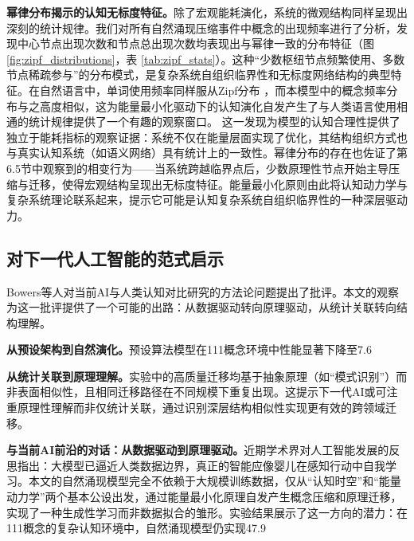\documentclass[12pt,a4paper]{article}
\begin{document}
\textbf{幂律分布揭示的认知无标度特征。}除了宏观能耗演化，系统的微观结构同样呈现出深刻的统计规律。我们对所有自然涌现压缩事件中概念的出现频率进行了分析，发现中心节点出现次数和节点总出现次数均表现出与幂律一致的分布特征（图 \ref{fig:zipf_distributions}，表 \ref{tab:zipf_stats}）。这种“少数枢纽节点频繁使用、多数节点稀疏参与”的分布模式，是复杂系统自组织临界性和无标度网络结构的典型特征。在自然语言中，单词使用频率同样服从Zipf分布 \citep{zipf1949human}，而本模型中的概念频率分布与之高度相似，这为能量最小化驱动下的认知演化自发产生了与人类语言使用相通的统计规律提供了一个有趣的观察窗口。 这一发现为模型的认知合理性提供了独立于能耗指标的观察证据：系统不仅在能量层面实现了优化，其结构组织方式也与真实认知系统（如语义网络）具有统计上的一致性。幂律分布的存在也佐证了第6.5节中观察到的相变行为——当系统跨越临界点后，少数原理性节点开始主导压缩与迁移，使得宏观结构呈现出无标度特征。能量最小化原则由此将认知动力学与复杂系统理论联系起来，提示它可能是认知复杂系统自组织临界性的一种深层驱动力。

\subsection{对下一代人工智能的范式启示}

Bowers等人对当前AI与人类认知对比研究的方法论问题提出了批评。本文的观察为这一批评提供了一个可能的出路：从数据驱动转向原理驱动，从统计关联转向结构理解。

\textbf{从预设架构到自然演化。}预设算法模型在111概念环境中性能显著下降至7.6%

\textbf{从统计关联到原理理解。}实验中的高质量迁移均基于抽象原理（如“模式识别”）而非表面相似性，且相同迁移路径在不同规模下重复出现。这提示下一代AI或可注重原理性理解而非仅统计关联，通过识别深层结构相似性实现更有效的跨领域迁移。

\textbf{与当前AI前沿的对话：从数据驱动到原理驱动。}近期学术界对人工智能发展的反思指出：大模型已逼近人类数据边界，真正的智能应像婴儿在感知行动中自我学习。本文的自然涌现模型完全不依赖于大规模训练数据，仅从“认知时空”和“能量动力学”两个基本公设出发，通过能量最小化原理自发产生概念压缩和原理迁移，实现了一种生成性学习而非数据拟合的雏形。实验结果展示了这一方向的潜力：在111概念的复杂认知环境中，自然涌现模型仍实现47.9%
\end{document}
